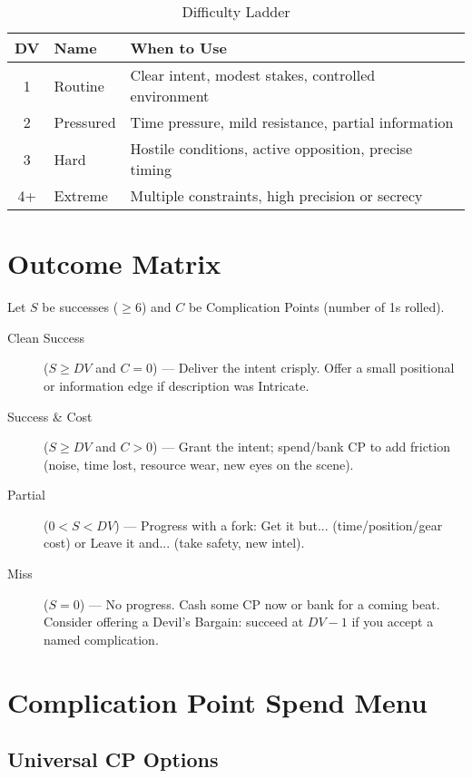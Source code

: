 \begin{table}[htbp]
\centering
\begin{tabular}{cll}
\toprule
\textbf{DV} & \textbf{Name} & \textbf{When to Use} \\
\midrule
1 & Routine & Clear intent, modest stakes, controlled environment \\
2 & Pressured & Time pressure, mild resistance, partial information \\
3 & Hard & Hostile conditions, active opposition, precise timing \\
4+ & Extreme & Multiple constraints, high precision or secrecy \\
\bottomrule
\end{tabular}
\caption{Difficulty Ladder}
\end{table}

\section{Outcome Matrix}

Let $S$ be successes ($\geq 6$) and $C$ be Complication Points (number of 1s rolled).

\begin{description}
\item[Clean Success] ($S \geq DV$ and $C = 0$) --- Deliver the intent crisply. Offer a small positional or information edge if description was Intricate.
\item[Success \& Cost] ($S \geq DV$ and $C > 0$) --- Grant the intent; spend/bank CP to add friction (noise, time lost, resource wear, new eyes on the scene).
\item[Partial] ($0 < S < DV$) --- Progress with a fork: Get it but... (time/position/gear cost) or Leave it and... (take safety, new intel).
\item[Miss] ($S = 0$) --- No progress. Cash some CP now or bank for a coming beat. Consider offering a Devil's Bargain: succeed at $DV-1$ if you accept a named complication.
\end{description}

\section{Complication Point Spend Menu}

\subsection{Universal CP Options}

